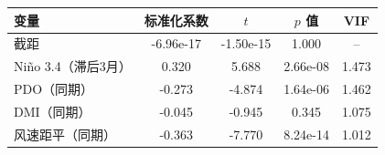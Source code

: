 \begin{tabular}{lcccc}
\hline
变量 & 标准化系数 & $t$ & $p$ 值 & VIF \\
\hline
截距 & -6.96e-17 & -1.50e-15 & 1.000 & -- \\
Ni\~{n}o 3.4（滞后3月） & 0.320 & 5.688 & 2.66e-08 & 1.473 \\
PDO（同期） & -0.273 & -4.874 & 1.64e-06 & 1.462 \\
DMI（同期） & -0.045 & -0.945 & 0.345 & 1.075 \\
风速距平（同期） & -0.363 & -7.770 & 8.24e-14 & 1.012 \\
\hline
\end{tabular}
